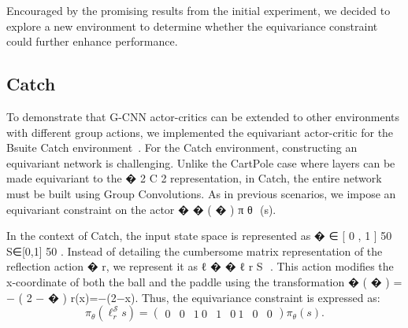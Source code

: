 Encouraged by the promising results from the initial experiment, we decided to explore a new environment to determine whether the equivariance constraint could further enhance performance.

\subsection{Catch}\label{sec:catch_ac}
To demonstrate that G-CNN actor-critics can be extended to other environments with different group actions, we implemented the equivariant actor-critic for the Bsuite Catch environment~\cite{osband2020bsuite}. For the Catch environment, constructing an equivariant network is challenging. Unlike the CartPole case where layers can be made equivariant to the
�
2
C
2
​
representation, in Catch, the entire network must be built using Group Convolutions. As in previous scenarios, we impose an equivariant constraint on the actor
�
�
(
�
)
π
θ
​
(s).

In the context of Catch, the input state space is represented as
�
∈
[
0
,
1
]
50
S∈[0,1]
50
. Instead of detailing the cumbersome matrix representation of the reflection action
�
r, we represent it as
ℓ
�
�
ℓ
r
S
​
. This action modifies the x-coordinate of both the ball and the paddle using the transformation
�
(
�
)
=
−
(
2
−
�
)
r(x)=−(2−x). Thus, the equivariance constraint is expressed as:
\begin{equation}
	\pi_\theta(\ell_r^\mathcal{S} s) = \begin{pmatrix}
		0 & 0 & 1 \
		0 & 1 & 0 \
		1 & 0 & 0
	\end{pmatrix}\pi_\theta(s).
\end{equation}
%

